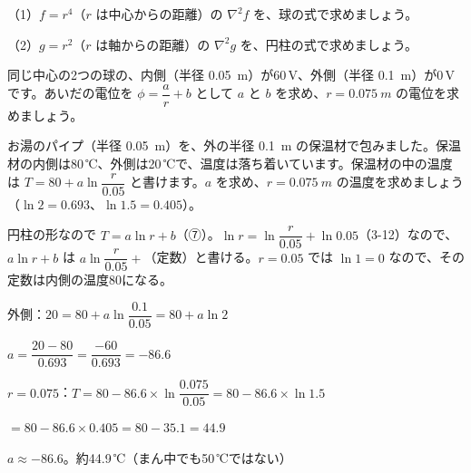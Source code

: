 \begingroup{}%
\noindent\begin{minipage}[t]{0.49\linewidth}
\begin{jibun}
\raggedright（1）$f=r^4$（$r$ は中心からの距離）の $\nabla^2f$ を、球の式で求めましょう。\par
（2）$g=r^2$（$r$ は軸からの距離）の $\nabla^2g$ を、円柱の式で求めましょう。
\end{jibun}
\end{minipage}\hfill
\begin{minipage}[t]{0.49\linewidth}
\begin{jibun}
\raggedright 同じ中心の2つの球の、内側（半径 \qty{0.05}{m}）が60\,V、外側（半径 \qty{0.1}{m}）が0\,V です。あいだの電位を $\phi=\dfrac{a}{r}+b$ として $a$ と $b$ を求め、$r=\qty{0.075}{m}$ の電位を求めましょう。
\end{jibun}
\end{minipage}\par
\endgroup

\begin{reidai}[パイプの保温材の中の温度]
お湯のパイプ（半径 \qty{0.05}{m}）を、外の半径 \qty{0.1}{m} の保温材で包みました。保温材の内側は80\,℃、外側は20\,℃で、温度は落ち着いています。保温材の中の温度は $T=80+a\ln\dfrac{r}{0.05}$ と書けます。$a$ を求め、$r=\qty{0.075}{m}$ の温度を求めましょう（$\ln2=0.693$、$\ln1.5=0.405$）。\par
\kangaekata 円柱の形なので $T=a\ln r+b$（⑦）。$\ln r=\ln\dfrac{r}{0.05}+\ln0.05$（3-12）なので、$a\ln r+b$ は $a\ln\dfrac{r}{0.05}+$（定数）と書ける。$r=0.05$ では $\ln1=0$ なので、その定数は内側の温度80になる。\par
\shiki 外側：$20=80+a\ln\dfrac{0.1}{0.05}=80+a\ln2$\par
\kviiimq $a=\dfrac{20-80}{0.693}=\dfrac{-60}{0.693}=-86.6$\par
\kviiimq $r=0.075$：$T=80-86.6\times\ln\dfrac{0.075}{0.05}=80-86.6\times\ln1.5$\par
\kviiimq $=80-86.6\times0.405=80-35.1=44.9$\par
\kotae $a\approx-86.6$。約44.9\,℃（まん中でも50\,℃ではない）
\end{reidai}

